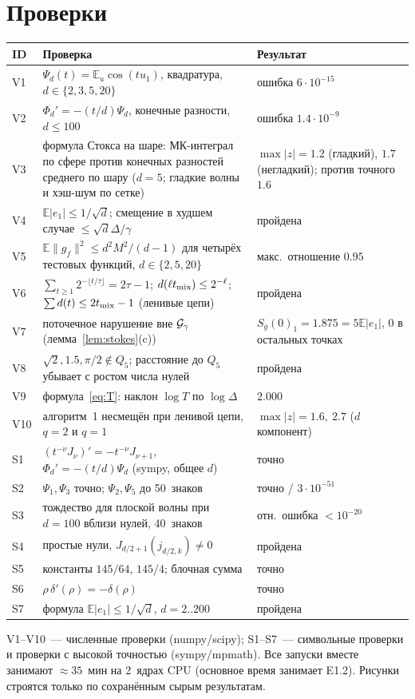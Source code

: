 \documentclass[11pt,a4paper]{article}
\numberwithin{equation}{section}
\theoremstyle{definition}
\theoremstyle{remark}
\newcommand{\E}{\mathbb E}\newcommand{\R}{\mathbb R}\newcommand{\N}{\mathbb N}\let\Prob\relax\newcommand{\Prob}{\mathbb P}
\newcommand{\norm}[1]{\lVert #1\rVert}\newcommand{\abs}[1]{\lvert #1\rvert}\newcommand{\ip}[2]{\langle #1,#2\rangle}
\begin{document}
\appendix
\section{Проверки}\label{app:checks}
\begin{center}\small
\begin{tabularx}{\textwidth}{@{}lXl@{}}
\toprule
\textbf{ID} & \textbf{Проверка} & \textbf{Результат}\\\midrule
V1 & $\Psi_d(t)=\E_u\cos(tu_1)$, квадратура, $d\in\{2,3,5,20\}$ & ошибка $6\cdot10^{-15}$ \\
V2 & $\Phi_d'=-(t/d)\Psi_d$, конечные разности, $d\le100$ & ошибка $1.4\cdot10^{-9}$ \\
V3 & формула Стокса на шаре: МК-интеграл по сфере против конечных разностей среднего по шару ($d=5$; гладкие волны и хэш-шум по сетке) & $\max|z|=1.2$ (гладкий), $1.7$ (негладкий); против точного $1.6$ \\
V4 & $\E|e_1|\le1/\sqrt d$; смещение в худшем случае $\le\sqrt d\Delta/\gamma$ & пройдена \\
V5 & $\E\norm{g_f}^2\le d^2M^2/(d-1)$ для четырёх тестовых функций, $d\in\{2,5,20\}$ & макс.\ отношение $0.95$ \\
V6 & $\sum_{t\ge1}2^{-\lfloor t/\tau\rfloor}=2\tau-1$; $d(\ell t_{\rm mix})\le2^{-\ell}$; $\sum d(t)\le2t_{\rm mix}-1$ (ленивые цепи) & пройдена \\
V7 & поточечное нарушение вне $\mathcal G_\gamma$ (лемма~\ref{lem:stokes}(c)) & $S_g(0)_1=1.875=5\E|e_1|$, $0$ в остальных точках \\
V8 & $\sqrt2,1.5,\pi/2\notin Q_5$; расстояние до $Q_5$ убывает с ростом числа нулей & пройдена \\
V9 & формула~\eqref{eq:T}: наклон $\log T$ по $\log\Delta$ & $2.000$ \\
V10 & алгоритм~1 несмещён при ленивой цепи, $q=2$ и $q=1$ & $\max|z|=1.6,\ 2.7$ ($d$ компонент) \\
S1 & $(t^{-\nu}J_\nu)'=-t^{-\nu}J_{\nu+1}$, $\Phi_d'=-(t/d)\Psi_d$ (sympy, общее $d$) & точно \\
S2 & $\Psi_1,\Psi_3$ точно; $\Psi_2,\Psi_5$ до 50~знаков & точно / $3\cdot10^{-51}$ \\
S3 & тождество для плоской волны при $d=100$ вблизи нулей, 40~знаков & отн.\ ошибка $<10^{-20}$ \\
S4 & простые нули, $J_{d/2+1}(j_{d/2,k})\neq0$ & пройдена \\
S5 & константы $145/64$, $145/4$; блочная сумма & точно \\
S6 & $\rho\,\delta'(\rho)=-\delta(\rho)$ & точно \\
S7 & формула $\E|e_1|\le1/\sqrt d$, $d=2..200$ & пройдена \\
\bottomrule
\end{tabularx}
\end{center}
V1--V10~--- численные проверки (numpy/scipy); S1--S7~--- символьные проверки и проверки с высокой точностью (sympy/mpmath). Все запуски вместе занимают $\approx35$~мин на 2~ядрах CPU (основное время занимает E1.2). Рисунки строятся только по сохранённым сырым результатам.
\end{document}
